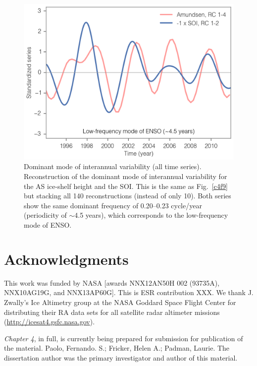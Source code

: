 \begin{figure}[!ht]
  \centering
  \includegraphics[width=.75\textwidth]{img/amu_soi_modes_all.png}
  \caption[Dominant mode of interannual variability (140 RCs)]{
  Dominant mode of interannual variability (all time series). Reconstruction of the dominant mode of interannual variability for the AS ice-shelf height and the SOI. This is the same as Fig.~\ref{c4f9} but stacking all 140 reconstructions (instead of only 10). Both series show the same dominant frequency of 0.20--0.23 cycle/year (periodicity of $\sim$4.5 years), which corresponds to the low-frequency mode of ENSO.
  }
  \label{c4f12}
\end{figure}


\clearpage
\section*{Acknowledgments}

\noindent
This work was funded by NASA [awards NNX12AN50H 002
(93735A), NNX10AG19G, and NNX13AP60G]. This is ESR
contribution XXX. We thank J. Zwally's Ice Altimetry group
at the NASA Goddard Space Flight Center for distributing their
RA data sets for all satellite radar altimeter missions
(\url{http://icesat4.gsfc.nasa.gov}).

{\sl Chapter 4}, in full, is currently being prepared for submission for publication
of the material. Paolo, Fernando. S.; Fricker, Helen A.; Padman, Laurie. The
dissertation author was the primary investigator and author of this material.
